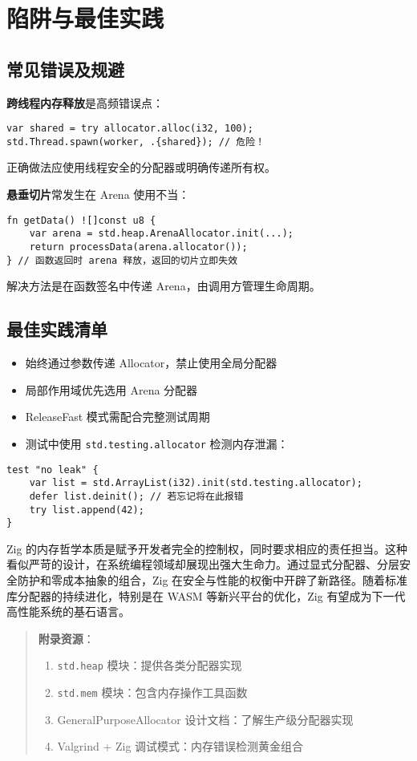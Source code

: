 \chapter{陷阱与最佳实践}
\section{常见错误及规避}
\textbf{跨线程内存释放}是高频错误点：\par
\begin{lstlisting}[language=zig]
var shared = try allocator.alloc(i32, 100);
std.Thread.spawn(worker, .{shared}); // 危险！
\end{lstlisting}
正确做法应使用线程安全的分配器或明确传递所有权。\par
\textbf{悬垂切片}常发生在 Arena 使用不当：\par
\begin{lstlisting}[language=zig]
fn getData() ![]const u8 {
    var arena = std.heap.ArenaAllocator.init(...);
    return processData(arena.allocator()); 
} // 函数返回时 arena 释放，返回的切片立即失效
\end{lstlisting}
解决方法是在函数签名中传递 Arena，由调用方管理生命周期。\par
\section{最佳实践清单}
\begin{itemize}
\item 始终通过参数传递 Allocator，禁止使用全局分配器
\item 局部作用域优先选用 Arena 分配器
\item ReleaseFast 模式需配合完整测试周期
\item 测试中使用 \texttt{std.testing.allocator} 检测内存泄漏：
\end{itemize}
\begin{lstlisting}[language=zig]
test "no leak" {
    var list = std.ArrayList(i32).init(std.testing.allocator);
    defer list.deinit(); // 若忘记将在此报错
    try list.append(42);
}
\end{lstlisting}
Zig 的内存哲学本质是赋予开发者完全的控制权，同时要求相应的责任担当。这种看似严苛的设计，在系统编程领域却展现出强大生命力。通过显式分配器、分层安全防护和零成本抽象的组合，Zig 在安全与性能的权衡中开辟了新路径。随着标准库分配器的持续进化，特别是在 WASM 等新兴平台的优化，Zig 有望成为下一代高性能系统的基石语言。\par
\begin{quote}
\textbf{附录资源}：\par
\begin{enumerate}
\item \texttt{std.heap} 模块：提供各类分配器实现
\item \texttt{std.mem} 模块：包含内存操作工具函数
\item GeneralPurposeAllocator 设计文档：了解生产级分配器实现
\item Valgrind + Zig 调试模式：内存错误检测黄金组合
\end{enumerate}
\end{quote}
